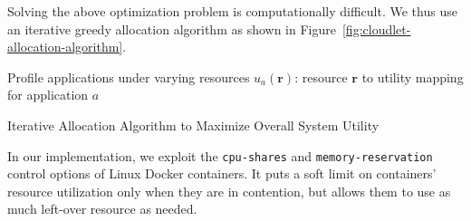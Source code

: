 Solving the above optimization problem is computationally difficult. We thus use
an iterative greedy allocation algorithm as shown in
Figure~\ref{fig:cloudlet-allocation-algorithm}.

\begin{algorithm}[]
\SetAlgoLined
 Profile applications under varying resources\;
 $u_a(\mathbf{r})$: resource $\mathbf{r}$ to utility mapping for application
 $a$\;
 \caption{Iterative Allocation Algorithm to Maximize Overall System Utility}
 \label{fig:cloudlet-allocation-algorithm}
\end{algorithm}


In our implementation, we exploit the \texttt{cpu-shares} and
\texttt{memory-reservation} control options of Linux Docker containers. It puts
a soft limit on containers' resource utilization only when they are in
contention, but allows them to use as much left-over resource as needed.